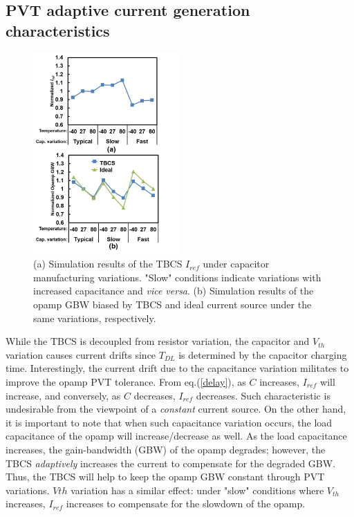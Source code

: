 \documentclass[paper]{ieice}
\begin{document}
\subsection{PVT adaptive current generation characteristics}
\begin{figure}[!t]
\centering
 \includegraphics[width=0.5\textwidth]{figs/iref_var.png}
  \caption{(a) Simulation results of the TBCS $I_{ref}$ under capacitor manufacturing variations. "Slow" conditions indicate variations with increased capacitance and \textit{vice versa}.  (b) Simulation results of the opamp GBW biased by TBCS and ideal current source under the same variations, respectively.}
\label{cvar}
\end{figure}

While the TBCS is decoupled from resistor variation, the capacitor and $V_{th}$ variation causes current drifts since $T_{DL}$ is determined by the capacitor charging time. Interestingly, the current drift due to the capacitance variation militates to improve the opamp PVT tolerance.
From eq.(\ref{delay}), as $C$ increases, $I_{ref}$ will increase, and conversely, as $C$ decreases, $I_{ref}$ decreases. Such characteristic is undesirable from the viewpoint of a \textit{constant} current source. On the other hand, it is important to note that when such capacitance variation occurs, the load capacitance of the opamp will increase/decrease as well. As the load capacitance increases, the gain-bandwidth (GBW) of the opamp degrades; however, the TBCS \textit{adaptively} increases the current to compensate for the degraded GBW. Thus, the TBCS will help to keep the opamp GBW constant through PVT variations. $V{th}$ variation has a similar effect: under "slow" conditions where $V_{th}$ increases, $I_{ref}$ increases to compensate for the slowdown of the opamp.
\end{document}

